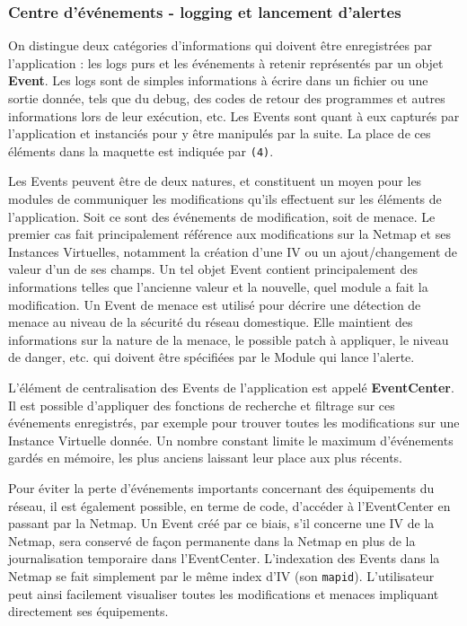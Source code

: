 \documentclass[]{article}
\begin{document}
\newpage

\subsubsection{Centre d’événements - logging et lancement d'alertes}

On distingue deux catégories d'informations qui doivent être enregistrées par l'application : les logs purs et les événements à retenir représentés par un objet \textbf{Event}. Les logs sont de simples informations à écrire dans un fichier ou une sortie donnée, tels que du debug, des codes de retour des programmes et autres informations lors de leur exécution, etc. Les Events sont quant à eux capturés par l'application et instanciés pour y être manipulés par la suite. La place de ces éléments dans la maquette est indiquée par \texttt{(4)}.\\

\par Les Events peuvent être de deux natures, et constituent un moyen pour les modules de communiquer les modifications qu'ils effectuent sur les éléments de l'application. Soit ce sont des événements de modification, soit de menace. Le premier cas fait principalement référence aux modifications sur la Netmap et ses Instances Virtuelles, notamment la création d'une IV ou un ajout/changement de valeur d'un de ses champs. Un tel objet Event contient principalement des informations telles que l'ancienne valeur et la nouvelle, quel module a fait la modification. Un Event de menace est utilisé pour décrire une détection de menace au niveau de la sécurité du réseau domestique. Elle maintient des informations sur la nature de la menace, le possible patch à appliquer, le niveau de danger, etc. qui doivent être spécifiées par le Module qui lance l'alerte.\\

\par L'élément de centralisation des Events de l'application est appelé \textbf{EventCenter}. Il est possible d'appliquer des fonctions de recherche et filtrage sur ces événements enregistrés, par exemple pour trouver toutes les modifications sur une Instance Virtuelle donnée. Un nombre constant limite le maximum d'événements gardés en mémoire, les plus anciens laissant leur place aux plus récents.\\

\par Pour éviter la perte d'événements importants concernant des équipements du réseau, il est également possible, en terme de code, d'accéder à l'EventCenter en passant par la Netmap. Un Event créé par ce biais, s'il concerne une IV de la Netmap, sera conservé de façon permanente dans la Netmap en plus de la journalisation temporaire dans l'EventCenter. L'indexation des Events dans la Netmap se fait simplement par le même index d'IV (son \texttt{mapid}). L'utilisateur peut ainsi facilement visualiser toutes les modifications et menaces impliquant directement ses équipements.
\end{document}

